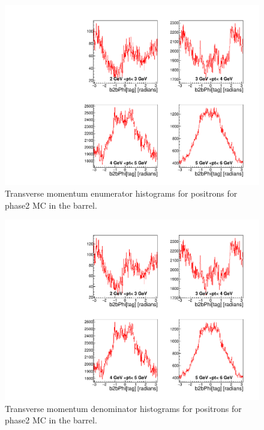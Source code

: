 \documentclass[a4paper,11pt,twosided,final,german,openbib,pdftex,listof=totoc,bibliography=totoc]{scrbook}
\begin{document}
\begin{appendix}
\begin{figure}[!htbp]
	\centering
	\includegraphics[width=\textwidth]{Plots/master/xPtMPhiepBarrelE_MC}
	\caption[Transverse Momentum $\phi$ Positron Barrel Enumerator Histogram Phase2 MC]{Transverse momentum enumerator histograms for positrons for phase2 MC in the barrel.}
	\label{plt:PtMPhiepBarrelE_MC}
\end{figure}

\begin{figure}[!htbp]
	\centering
	\includegraphics[width=\textwidth]{Plots/master/xPtMPhiepBarrelD_MC}
	\caption[Transverse Momentum $\phi$ Positron Barrel Denominator Histogram Phase2 MC]{Transverse momentum denominator histograms for positrons for phase2 MC in the barrel.}
	\label{plt:PtMPhiepBarrelD_MC}
\end{figure}



\end{appendix}
\end{document}
